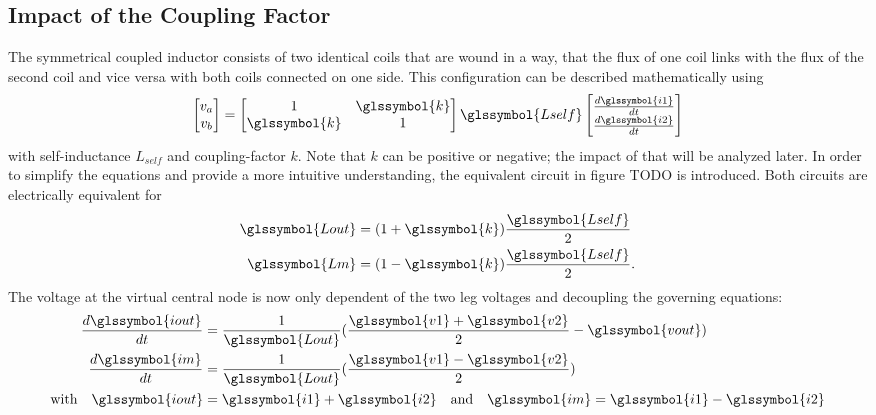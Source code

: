\documentclass{IPEC2026}
\newcommand{\sbl}[1]{\glssymbol{#1}}
\begin{document}
\subsection{Impact of the Coupling Factor}
The symmetrical coupled inductor consists of two identical coils that are wound in a way, that the flux of one coil links with the flux of the second coil and vice versa with both coils connected on one side. This configuration can be described mathematically using 
\begin{equation}
  \label{eq:StandardCoupling}
  \begin{bmatrix} v_a \\ v_b \end{bmatrix} = \begin{bmatrix} 1 & \sbl{k} \\ \sbl{k} & 1 \end{bmatrix} \sbl{Lself} \begin{bmatrix} \frac{d\sbl{i1}}{dt}  \\ \frac{d\sbl{i2}}{dt} \end{bmatrix}
\end{equation}
with self-inductance $L_{self}$ and coupling-factor $k$. Note that $k$ can be positive or negative; the impact of that will be analyzed later.
In order to simplify the equations and provide a more intuitive understanding, the equivalent circuit in figure TODO is introduced. Both circuits are electrically equivalent for
\begin{equation}
  \label{eq:LoutandLmfromk}
  \begin{aligned}
    \sbl{Lout} & = (1+\sbl{k})\frac{\sbl{Lself}}{2} \\
    \sbl{Lm} & = (1-\sbl{k})\frac{\sbl{Lself}}{2}.
  \end{aligned}
\end{equation}
The voltage at the virtual central node is now only dependent of the two leg voltages \sbl{v1} and \sbl{v2} decoupling the governing equations:
\begin{equation}
  \label{eq:TransformerModel}
  \begin{aligned}
    \frac{d\sbl{iout}}{dt} &= \frac{1}{\sbl{Lout}} (\frac{\sbl{v1} + \sbl{v2}}{2}-\sbl{vout}) \\
    \frac{d\sbl{im}}{dt} &= \frac{1}{\sbl{Lout}} (\frac{\sbl{v1} - \sbl{v2}}{2}) \\
    \text{with} \quad \sbl{iout} &= \sbl{i1} + \sbl{i2} \quad \text{and} \quad \sbl{im} = \sbl{i1} - \sbl{i2}
  \end{aligned}
\end{equation}
\end{document}
